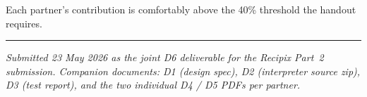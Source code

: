 \documentclass[11pt,a4paper]{article}
\begin{document}
\medskip
\noindent Each partner's contribution is comfortably above the 40\%
threshold the handout requires.

\vspace{1em}
\noindent\rule{\textwidth}{0.4pt}
\vspace{0.3em}

\noindent\small\emph{Submitted 23 May 2026 as the joint D6 deliverable
for the Recipix Part~2 submission. Companion documents: D1 (design
spec), D2 (interpreter source zip), D3 (test report), and the two
individual D4 / D5 PDFs per partner.}
\end{document}
